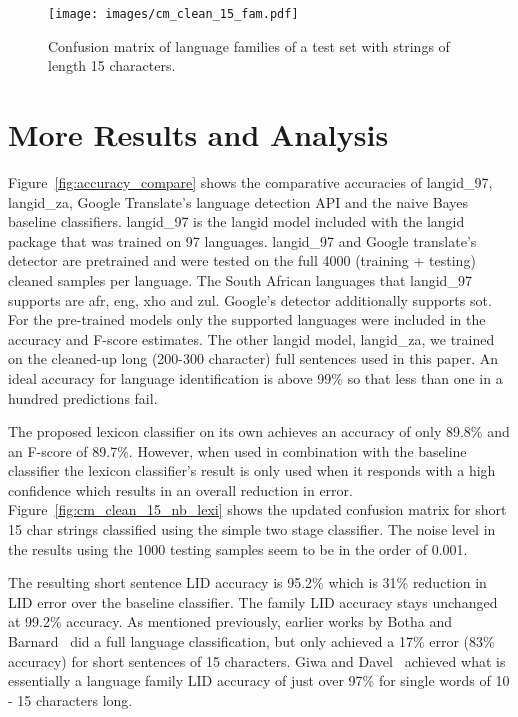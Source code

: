 \documentclass[conference]{IEEEtran}
\begin{document}
\begin{figure}[!t]
\centering
\texttt{[image: images/cm\_clean\_15\_fam.pdf]}
\caption{Confusion matrix of language families of a test set with strings of length 15 characters.}
\label{fig:cm_clean_15_fam}
\end{figure}

\section{More Results and Analysis}
\label{sec:results}

Figure~\ref{fig:accuracy_compare} shows the comparative accuracies of langid\_97, langid\_za, Google Translate's language detection API and the naive Bayes baseline classifiers. langid\_97 is the langid model included with the langid package that was trained on 97 languages. langid\_97 and Google translate's detector are pretrained and were tested on the full 4000 (training + testing) cleaned samples per language. The South African languages that langid\_97 supports are afr, eng, xho and zul. Google's detector additionally supports sot. For the pre-trained models only the supported languages were included in the accuracy and F-score estimates. The other langid model, langid\_za, we trained on the cleaned-up long (200-300 character) full sentences used in this paper. An ideal accuracy for language identification is above 99\% so that less than one in a hundred predictions fail.

The proposed lexicon classifier on its own achieves an accuracy of only 89.8\% and an F-score of 89.7\%. However, when used in combination with the baseline classifier the lexicon classifier's result is only used when it responds with a high confidence which results in an overall reduction in error. Figure~\ref{fig:cm_clean_15_nb_lexi} shows the updated confusion matrix for short 15 char strings classified using the simple two stage classifier. The noise level in the results using the 1000 testing samples seem to be in the order of 0.001.


The resulting short sentence LID accuracy is 95.2\% which is 31\% reduction in LID error over the baseline classifier. The family LID accuracy stays unchanged at 99.2\% accuracy. As mentioned previously, earlier works by Botha and Barnard~\cite{BothaBarnard2012} did a full language classification, but only achieved a 17\% error (83\% accuracy) for short sentences of 15 characters. Giwa and Davel~\cite{GiwaDavel2014} achieved what is essentially a language family LID accuracy of just over 97\% for single words of 10 - 15 characters long.
\end{document}
